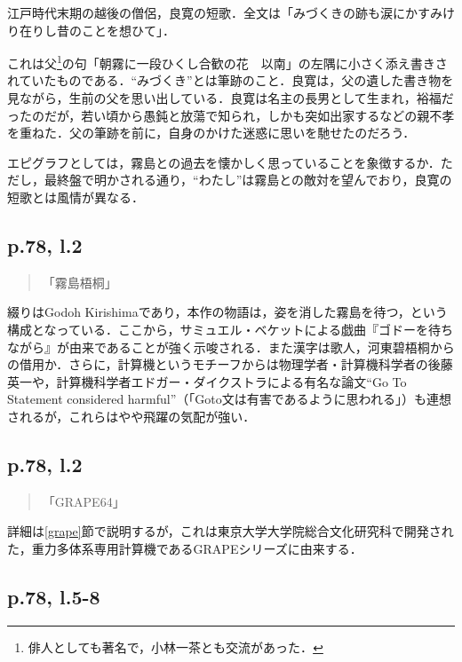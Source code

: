 \documentclass[10pt, a5paper, twoside]{ltjsarticle}
\begin{document}
            江戸時代末期の越後の僧侶，良寛の短歌．全文は「みづくきの跡も涙にかすみけり在りし昔のことを想ひて」．

            これは父\footnote{俳人としても著名で，小林一茶とも交流があった．}の句「朝霧に一段ひくし合歓の花　以南」の左隅に小さく添え書きされていたものである\cite{togo}．“みづくき”とは筆跡のこと．良寛は，父の遺した書き物を見ながら，生前の父を思い出している\cite{ryo100}．良寛は名主の長男として生まれ，裕福だったのだが，若い頃から愚鈍と放蕩で知られ，しかも突如出家するなどの親不孝を重ねた．父の筆跡を前に，自身のかけた迷惑に思いを馳せたのだろう．

            エピグラフとしては，霧島との過去を懐かしく思っていることを象徴するか．ただし，最終盤で明かされる通り，“わたし”は霧島との敵対を望んでおり，良寛の短歌とは風情が異なる．

        \subsection{p.78, l.2}

            \begin{quote}
                「霧島梧桐」
            \end{quote}

            綴りはGodoh Kirishimaであり，本作の物語は，姿を消した霧島を待つ，という構成となっている．ここから，サミュエル・ベケットによる戯曲『ゴドーを待ちながら』が由来であることが強く示唆される．また漢字は歌人，河東碧梧桐からの借用か．さらに，計算機というモチーフからは物理学者・計算機科学者の後藤英一や，計算機科学者エドガー・ダイクストラによる有名な論文``Go To Statement considered harmful''（「Goto文は有害であるように思われる」）\cite{dijkstra}も連想されるが，これらはやや飛躍の気配が強い．

        \subsection{p.78, l.2}

            \begin{quote}
                「GRAPE64」
            \end{quote}

            詳細は\ref{grape}節で説明するが，これは東京大学大学院総合文化研究科で開発された，重力多体系専用計算機であるGRAPEシリーズに由来する．

        \subsection{p.78, l.5-8}
\end{document}
